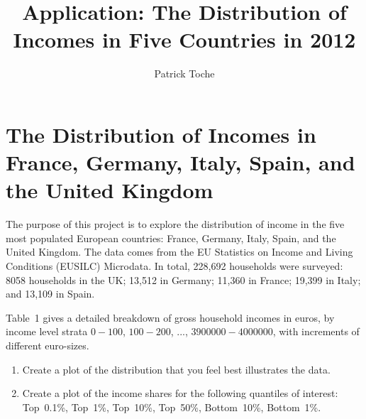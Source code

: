 \documentclass[a4,12pt]{article}%
\title{Application: The Distribution of Incomes in Five Countries in 2012}
\author{Patrick Toche}
\date{}
\begin{document}
\maketitle

\newpage



\section*{The Distribution of Incomes in France, Germany, Italy, Spain, and the United Kingdom}

The purpose of this project is to explore the distribution of income in the five most populated European countries: France, Germany, Italy, Spain, and the United Kingdom. The data comes from the EU Statistics on Income and Living Conditions (EUSILC) Microdata. In total, 228,692 households were surveyed: 8058 households in the UK; 13,512 in Germany; 11,360 in France; 19,399 in Italy; and 13,109 in Spain. 

Table~1 gives a detailed breakdown of gross household incomes in euros, by income level strata $0-100$, $100-200$, $...$, $3900000-4000000$, with increments of different euro-sizes. 


\begin{enumerate}

\item 
Create a plot of the distribution that you feel best illustrates the data.

\item 
Create a plot of the income shares for the following quantiles of interest: Top~0.1\%, Top~1\%, Top~10\%, Top~50\%, Bottom~10\%, Bottom~1\%.

\end{enumerate}
\end{document}
